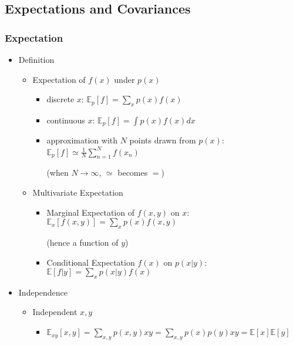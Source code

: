 \subsection{Expectations and Covariances}

\subsubsection{Expectation}
\begin{itemize}
\item Definition
	\begin{itemize}
	\item Expectation of $f(x)$ under $p(x)$
		\begin{itemize}
		\item discrete $x$: $\displaystyle \mathbb{E}_{p}[f] = \sum_xp(x)f(x)$
		\item continuous $x$: $\displaystyle \mathbb{E}_{p}[f] = \int p(x)f(x)dx$
		\item approximation with $N$ points drawn from $p(x)$: $\displaystyle \mathbb E_p[f] \simeq \frac 1N \sum_{n=1}^N f(x_n) $
		
		(when $N\rightarrow \infty$, $\simeq$ becomes $=$)
		\end{itemize}
	\item Multivariate Expectation
		\begin{itemize}
		\item Marginal Expectation of $f(x,y)$ on $x$: $\displaystyle \mathbb{E}_x[f(x,y)] = \sum_xp(x)f(x,y)$ 
		
		(hence a function of $y$)
		\item Conditional Expectation $f(x)$ on $p(x|y)$: $\displaystyle \mathbb{E}[f|y] = \sum_x p(x|y)f(x)$
		\end{itemize}
	\end{itemize}
\item Independence
	\begin{itemize}
	\item Independent $x,y$
		\begin{itemize}
		\item $\displaystyle \mathbb{E}_{xy}[x,y] = \sum_{x,y}p(x,y)xy = \sum_{x,y}p(x)p(y)xy = \mathbb{E}[x]\mathbb{E}[y]$
		\end{itemize}
	\end{itemize}
\end{itemize}

